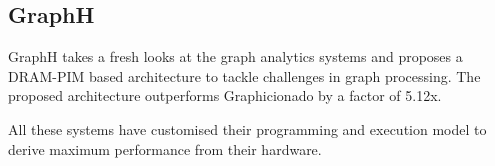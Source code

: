  \subsection{GraphH} \cite{GraphH} GraphH takes a fresh looks at the graph analytics systems and proposes a DRAM-PIM based architecture to tackle challenges in graph processing. The proposed architecture outperforms Graphicionado by a factor of 5.12x.

All these systems have customised their programming and execution model to derive maximum performance from their hardware.
